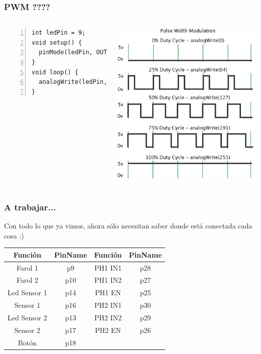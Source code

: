 \documentclass[compress]{beamer}
\begin{document}
\begin{frame}[fragile]
 \frametitle{PWM ????}
 \begin{columns}
\begin{Verbatim}[formatcom=\color{red},fontseries=b, numbers=left,numbersep=3pt]
int ledPin = 9;
void setup() {
  pinMode(ledPin, OUTPUT);
}
void loop() {
  analogWrite(ledPin, 100);
}
\end{Verbatim}
  \flushright
  \includegraphics[width=\columnwidth]{./img/PWM.png}
 \end{columns}

\begin{center}
 
\end{center}
\end{frame}


\begin{frame}
\frametitle{A trabajar...}
Con todo lo que ya vimos, ahora sólo necesitan saber donde está conectada cada cosa :)
\begin{center}
\begin{tabular}{|c|c|c|c|}
\hline
\textbf{Función} & \textbf{PinName} & \textbf{Función} & \textbf{PinName}\\\hline
Farol 1 & p9 & PH1 IN1 & p28\\\hline
Farol 2 & p10 & PH1 IN2 & p27\\\hline
Led Sensor 1 & p14 & PH1 EN & p25\\\hline
Sensor 1 & p16 & PH2 IN1 & p30\\\hline
Led Sensor 2 & p13 & PH2 IN2 & p29\\\hline
Sensor 2 & p17 & PH2 EN & p26\\\hline
Botón & p18 & & \\\hline
\end{tabular}
\end{center}
\end{frame}
\end{document}
